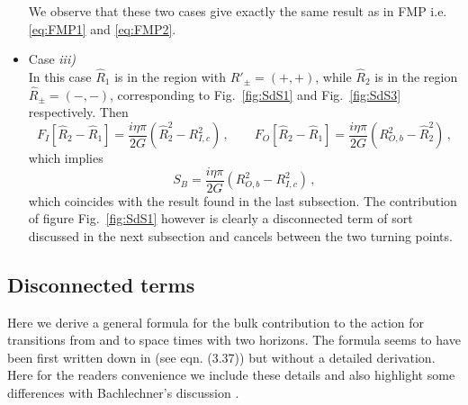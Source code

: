 \documentclass[a4paper,11pt]{article}
\numberwithin{equation}{section}
\newcommand{\citep}{\cite}
\numberwithin{equation}{section}
\begin{document}
\begin{itemize}[leftmargin=*]
We observe that these two cases give exactly the same result as in FMP i.e. \eqref{eq:FMP1} and \eqref{eq:FMP2}.
\item[]{Case \textit{iii)}}\\
In this case $\hat{R}_1$ is in the region with $R'_{\pm} = (+,+)$, while $\hat{R}_2$ is in the region $\hat{R}_{\pm} = (-,-)$, corresponding to Fig.~\ref{fig:SdS1} and Fig.~\ref{fig:SdS3} respectively. Then
\begin{equation}
F_I[\hat{R}_2 - \hat{R}_1] = \frac{i \eta \pi}{2G}\left(\hat{R}_2^2 - R_{I, c}^2\right) \,, \qquad F_O[\hat{R}_2 - \hat{R}_1] = \frac{i \eta \pi}{2G} \left(R_{O, b}^2 - \hat{R}_2^2\right) \,,
\end{equation}
which implies
\begin{equation}
S_B = \frac{i \eta \pi}{2G} \left(R_{O, b}^2 - R_{I, c}^2\right) \,,
\end{equation}
which coincides with the result found in the last subsection. The contribution of figure Fig.~\ref{fig:SdS1} however is clearly a disconnected term of sort discussed in the next subsection and cancels between the two turning points. 
\end{itemize}

\subsection{Disconnected terms}

Here we derive a general formula for the bulk contribution to the
action for transitions from and to space times with two horizons.
The formula seems to have been first written down in \citep{Bachlechner:2016mtp}
(see eqn. (3.37)) but without a detailed derivation. Here for the
readers convenience we include these details and also highlight some
differences with Bachlechner's discussion \citep{Bachlechner:2016mtp}.
\end{document}
